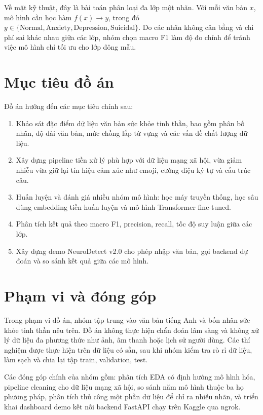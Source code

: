 \documentclass[12pt,a4paper,oneside]{report}
\newlength{\manualparindent}
\newcommand{\manualindent}{\hspace*{\manualparindent}}
\begin{document}
\manualindent%
Về mặt kỹ thuật, đây là bài toán phân loại đa lớp một nhãn. Với mỗi văn bản $x$, mô hình cần học hàm $f(x) \rightarrow y$, trong đó $y \in \{\text{Normal}, \text{Anxiety}, \text{Depression}, \text{Suicidal}\}$. Do các nhãn không cân bằng và chi phí sai khác nhau giữa các lớp, nhóm chọn macro F1 làm độ đo chính để tránh việc mô hình chỉ tối ưu cho lớp đông mẫu.

\section{Mục tiêu đồ án}

Đồ án hướng đến các mục tiêu chính sau:

\begin{enumerate}[label=\arabic*.]
  \item Khảo sát đặc điểm dữ liệu văn bản sức khỏe tinh thần, bao gồm phân bố nhãn, độ dài văn bản, mức chồng lắp từ vựng và các vấn đề chất lượng dữ liệu.
  \item Xây dựng pipeline tiền xử lý phù hợp với dữ liệu mạng xã hội, vừa giảm nhiễu vừa giữ lại tín hiệu cảm xúc như emoji, cường điệu ký tự và cấu trúc câu.
  \item Huấn luyện và đánh giá nhiều nhóm mô hình: học máy truyền thống, học sâu dùng embedding tiền huấn luyện và mô hình Transformer fine-tuned.
  \item Phân tích kết quả theo macro F1, precision, recall, tốc độ suy luận giữa các lớp.
  \item Xây dựng demo NeuroDetect v2.0 cho phép nhập văn bản, gọi backend dự đoán và so sánh kết quả giữa các mô hình.
\end{enumerate}

\section{Phạm vi và đóng góp}

\manualindent%
Trong phạm vi đồ án, nhóm tập trung vào văn bản tiếng Anh và bốn nhãn sức khỏe tinh thần nêu trên. Đồ án không thực hiện chẩn đoán lâm sàng và không xử lý dữ liệu đa phương thức như ảnh, âm thanh hoặc lịch sử người dùng. Các thí nghiệm được thực hiện trên dữ liệu có sẵn, sau khi nhóm kiểm tra rò rỉ dữ liệu, làm sạch và chia lại tập train, validation, test.

\manualindent%
Các đóng góp chính của nhóm gồm: phân tích EDA có định hướng mô hình hóa, pipeline cleaning cho dữ liệu mạng xã hội, so sánh năm mô hình thuộc ba họ phương pháp, phân tích thủ công một phần dữ liệu để chỉ ra nhiễu nhãn, và triển khai dashboard demo kết nối backend FastAPI chạy trên Kaggle qua ngrok.
\end{document}
